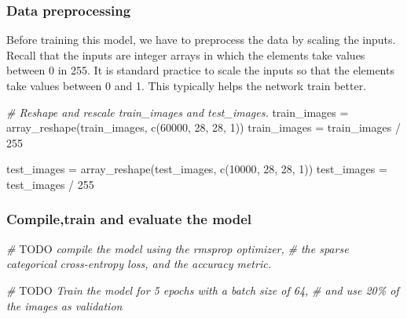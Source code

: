 \documentclass[
  a4paper,
]{article}
\newenvironment{Shaded}{\begin{snugshade}}{\end{snugshade}}
\newcommand{\AlertTok}[1]{\textcolor[rgb]{0.94,0.16,0.16}{#1}}
\newcommand{\CommentTok}[1]{\textcolor[rgb]{0.56,0.35,0.01}{\textit{#1}}}
\newcommand{\DecValTok}[1]{\textcolor[rgb]{0.00,0.00,0.81}{#1}}
\newcommand{\FunctionTok}[1]{\textcolor[rgb]{0.00,0.00,0.00}{#1}}
\newcommand{\NormalTok}[1]{#1}
\newcommand{\OtherTok}[1]{\textcolor[rgb]{0.56,0.35,0.01}{#1}}
\newcommand{\SpecialCharTok}[1]{\textcolor[rgb]{0.00,0.00,0.00}{#1}}
\begin{document}
\hypertarget{data-preprocessing}{%
\subsubsection{Data preprocessing}\label{data-preprocessing}}

Before training this model, we have to preprocess the data by scaling
the inputs. Recall that the inputs are integer arrays in which the
elements take values between 0 in 255. It is standard practice to scale
the inputs so that the elements take values between 0 and 1. This
typically helps the network train better.

\begin{Shaded}
\begin{Highlighting}[]
\CommentTok{\# Reshape and rescale train\_images and test\_images.}
\NormalTok{train\_images }\OtherTok{=} \FunctionTok{array\_reshape}\NormalTok{(train\_images, }\FunctionTok{c}\NormalTok{(}\DecValTok{60000}\NormalTok{, }\DecValTok{28}\NormalTok{, }\DecValTok{28}\NormalTok{, }\DecValTok{1}\NormalTok{))}
\NormalTok{train\_images }\OtherTok{=}\NormalTok{ train\_images }\SpecialCharTok{/} \DecValTok{255}

\NormalTok{test\_images }\OtherTok{=} \FunctionTok{array\_reshape}\NormalTok{(test\_images, }\FunctionTok{c}\NormalTok{(}\DecValTok{10000}\NormalTok{, }\DecValTok{28}\NormalTok{, }\DecValTok{28}\NormalTok{, }\DecValTok{1}\NormalTok{))}
\NormalTok{test\_images }\OtherTok{=}\NormalTok{ test\_images }\SpecialCharTok{/} \DecValTok{255}
\end{Highlighting}
\end{Shaded}

\hypertarget{compiletrain-and-evaluate-the-model}{%
\subsubsection{Compile,train and evaluate the
model}\label{compiletrain-and-evaluate-the-model}}

\begin{Shaded}
\begin{Highlighting}[]
\CommentTok{\# }\AlertTok{TODO}\CommentTok{ compile the model using the rmsprop optimizer,}
\CommentTok{\# the sparse categorical cross{-}entropy loss, and the accuracy metric.}
\end{Highlighting}
\end{Shaded}

\begin{Shaded}
\begin{Highlighting}[]
\CommentTok{\# }\AlertTok{TODO}\CommentTok{ Train the model for 5 epochs with a batch size of 64,}
\CommentTok{\# and use 20\% of the images as validation}
\end{Highlighting}
\end{Shaded}
\end{document}

